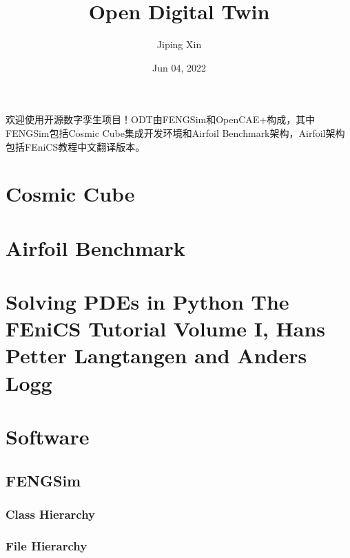 \documentclass[letterpaper,10pt,english]{sphinxmanual}
\title{Open Digital Twin}
\date{Jun 04, 2022}
\author{Jiping Xin}
\begin{document}
\pagestyle{empty}
\sphinxmaketitle
\pagestyle{plain}
\sphinxtableofcontents
\pagestyle{normal}
\label{\detokenize{index::doc}}
\sphinxAtStartPar
欢迎使用开源数字孪生项目！ODT由FENGSim和OpenCAE+构成，其中FENGSim包括Cosmic Cube集成开发环境和Airfoil Benchmark架构，Airfoil架构包括FEniCS教程中文翻译版本。




\chapter{Cosmic Cube}
\label{\detokenize{index:cosmic-cube}}

\chapter{Airfoil Benchmark}
\label{\detokenize{index:airfoil-benchmark}}

\chapter{Solving PDEs in Python \textendash{} The FEniCS Tutorial Volume I, Hans Petter Langtangen and Anders Logg}
\label{\detokenize{index:solving-pdes-in-python-the-fenics-tutorial-volume-i-hans-petter-langtangen-and-anders-logg}}

\chapter{Software}
\label{\detokenize{index:software}}
\sphinxstepscope


\section{FENGSim}
\label{\detokenize{api/library_root:fengsim}}\label{\detokenize{api/library_root::doc}}

\subsection{Class Hierarchy}
\label{\detokenize{api/library_root:class-hierarchy}}



\subsection{File Hierarchy}
\label{\detokenize{api/library_root:file-hierarchy}}
\end{document}
